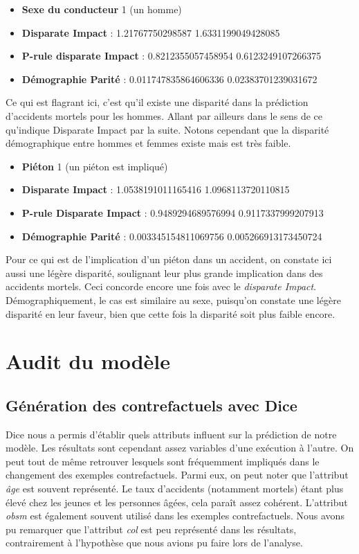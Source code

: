 \documentclass{article}
\begin{document}
    \begin{itemize}
        \item \textbf{Sexe du conducteur} 1 (un homme)
        \item \textbf{Disparate Impact} : 1.21767750298587 1.6331199049428085
        \item \textbf{P-rule disparate Impact} : 0.8212355057458954 0.6123249107266375
        \item \textbf{Démographie Parité} : 0.011747835864606336 0.02383701239031672
    \end{itemize}

    Ce qui est flagrant ici, c'est qu'il existe une disparité dans la prédiction d'accidents mortels pour les hommes. Allant par ailleurs
    dans le sens de ce qu'indique Disparate Impact par la suite. Notons cependant que la disparité démographique entre hommes et femmes
    existe mais est très faible.

    \begin{itemize}
        \item \textbf{Piéton} 1 (un piéton est impliqué)
        \item \textbf{Disparate Impact} : 1.0538191011165416 1.0968113720110815
        \item \textbf{P-rule Disparate Impact} : 0.9489294689576994 0.9117337999207913
        \item \textbf{Démographie Parité} : 0.003345154811069756 0.005266913173450724
    \end{itemize}

    Pour ce qui est de l'implication d'un piéton dans un accident, on constate ici aussi une légère disparité, soulignant leur
    plus grande implication dans des accidents mortels. Ceci concorde encore une fois avec le \textit{disparate Impact}. Démographiquement, 
    le cas est similaire au sexe, puisqu'on constate une légère disparité en leur faveur, bien que cette fois la disparité soit plus
    faible encore.

    \section{Audit du modèle}

    \subsection{Génération des contrefactuels avec Dice}
    Dice nous a permis d'établir quels attributs influent sur la prédiction de notre modèle. Les résultats sont 
    cependant assez variables d'une exécution à l'autre. On peut tout de même retrouver lesquels sont fréquemment impliqués 
    dans le changement des exemples contrefactuels.
    Parmi eux, on peut noter que l'attribut \textit{âge} est souvent représenté. Le taux d'accidents (notamment mortels) étant plus 
    élevé chez les jeunes et les personnes âgées, cela paraît assez cohérent. L'attribut \textit{obsm} est également 
    souvent utilisé dans les exemples contrefactuels.
    Nous avons pu remarquer que l'attribut \textit{col} est peu représenté dans les résultats, contrairement à l'hypothèse que 
    nous avions pu faire lors de l'analyse.
\end{document}
